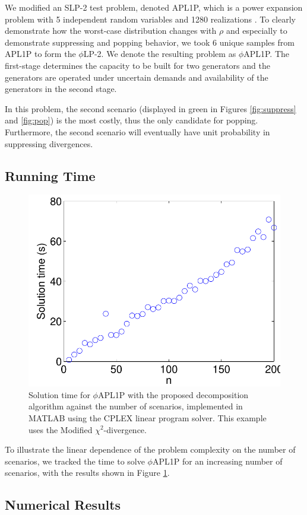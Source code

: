 \documentclass[opre,nonblindrev]{informs3} %
\newcommand{\plp}{$\phi$LP-2}
\begin{document}
We modified an SLP-2 test problem, denoted APL1P, which is a power expansion problem with 5 independent random variables and 1280 realizations \citep{infanger1992monte}.
To clearly demonstrate how the worst-case distribution changes with $\rho$ and especially to demonstrate suppressing and popping behavior, we took 6 unique samples from APL1P to form the \plp. 
We denote the resulting problem as $\phi$APL1P. 
The first-stage determines the capacity to be built for two generators and the generators are operated under uncertain demands and availability of the generators in the second stage.

In this problem, the second scenario (displayed in green in Figures \ref{fig:suppress} and \ref{fig:pop}) is the most costly, thus the only candidate for popping. %
Furthermore, the second scenario will eventually have unit probability in suppressing divergences.

\subsection{Running Time}
\label{ssec:run_time}

\begin{figure}
	\FIGURE
	{%
		\includegraphics*[width=.45\textwidth]{images/runtime}
	}
	{
		Solution time for $\phi$APL1P with the proposed decomposition algorithm against the number of scenarios, implemented in MATLAB using the CPLEX linear program solver.
		This example uses the Modified $\chi^2$-divergence.
		\label{fig:runtime}
	}
	{}
\end{figure}

To illustrate the linear dependence of the problem complexity on the number of scenarios, we tracked the time to solve $\phi$APL1P for an increasing number of scenarios, with the results shown in Figure \ref{fig:runtime}.


\subsection{Numerical Results}
\label{ssec:numerical_results}
\end{document}
